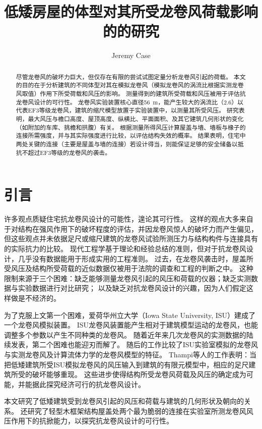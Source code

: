 \documentclass{ctexart}
\title{低矮房屋的体型对其所受龙卷风荷载影响的的研究}
\author{Jeremy Case}
\date{}
\begin{document}
\maketitle

\begin{abstract}
尽管龙卷风的破坏力巨大，但仅存在有限的尝试试图定量分析龙卷风引起的荷载。
本文的目的在于分析建筑的不同体型对其在模拟龙卷风（模拟龙卷风的涡流比根据实测龙卷风取值）作用下所受荷载和风压的影响。
测量得到的建筑所受荷载和风压被用于评估抗龙卷风设计的可行性。
龙卷风实验装置核心直径\SI{56}{m}，能产生较大的涡流比（\num{2.6}）以代表EF3等级龙卷风，建筑的缩尺模型放置于实验装置中，以测量其所受风压。
研究表明，最大风压与檐口高度、屋顶高度、纵横比、平面面积、及其它建筑几何形状的变化（如附加的车库、挑檐和拱腹）有关。
根据测量所得风压计算屋盖与墙、墙板与椽子的连接所需强度，并与其实际强度进行比较，以评估结构失效的概率。
结果表明，住宅中两处关键的连接（主要是屋盖与墙的连接）若设计得当，则能保证足够的安全储备以抵抗不超过EF3等级的龙卷风的袭击。
\end{abstract}

\section{引言}
许多观点质疑住宅抗龙卷风设计的可能性，遑论其可行性。
这样的观点大多来自于对结构在强风作用下的破坏程度的评估，并因龙卷风惊人的破坏力而产生偏见，
但这些观点并未依据足尺或缩尺建筑的龙卷风试验所测压力与结构构件与连接具有的实际抗力的比较。
现代工程学基于理论和经验总结的准则，但对于抗龙卷风设计，几乎没有数据能用于形成实用的工程准则。
过去，在龙卷风袭击时，屋盖所受风压及结构所受荷载的近似数据仅被用于法院的调查和工程的判断之中。
这种限制来源于三个困难：缺乏能够测量龙卷风引起的风压和荷载的仪器；缺乏实测数据与实验数据进行对比研究；
以及缺乏对抗龙卷风设计的兴趣，因为人们假定这样做是不经济的。

为了克服上文第一个困难，爱荷华州立大学（Iowa State University, ISU）建成了一个龙卷风模拟装置。
ISU龙卷风装置能产生相对于建筑模型运动的龙卷风，也能调整多个参数以产生不同种类的龙卷风。
随着近年来几次龙卷风的实测数据的陆续发表，第二个困难也能迎刃而解了。
随后的工作比较了ISU实验室模拟的龙卷风与实测龙卷风及计算流体力学的龙卷风模型的特征。
Thampi等人的工作表明：当把低矮建筑所受ISU模拟龙卷风的风压输入到建筑的有限元模型中，相应的足尺建筑所受的破坏能够重现。
这些进步使得结构所受龙卷风荷载及风压的确定成为可能，并能据此探究经济可行的抗龙卷风设计。

本文研究了低矮建筑受到龙卷风引起的风压和荷载与建筑的几何形状及朝向的关系。
还研究了轻型木框架结构屋盖处两个最为脆弱的连接在实验室所测龙卷风风压作用下的抗掀能力，以探究抗龙卷风设计的可行性。
\end{document}
